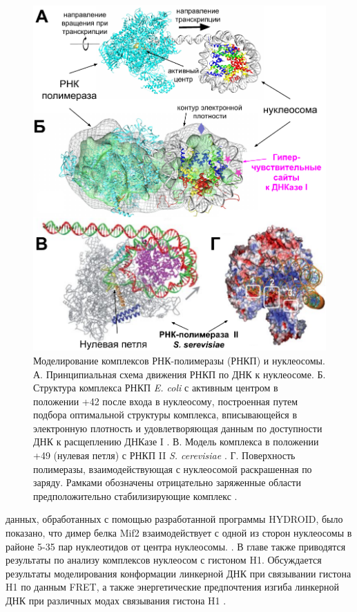 \begin{figure} [H]
    \centering
    \includegraphics[width=\textwidth]{images/p6/p6_2/p6_2_polII_synopsis.pdf}
    \caption{Моделирование комплексов РНК-полимеразы (РНКП) и нуклеосомы. А. Принципиальная схема движения РНКП по ДНК к нуклеосоме. Б. Структура комплекса РНКП \textit{E. coli} с активным центром в положении +42 после входа в нуклеосому, построенная путем подбора оптимальной структуры комплекса, вписывающейся в электронную плотность и удовлетворяющая данным по доступности ДНК к расщеплению ДНКазе I \cite{gaykalova_structural_2015}. В. Модель комплекса в положении +49 (нулевая петля) с РНКП II \textit{S. cerevisiae} \cite{chang_analysis_2014}. Г. Поверхность полимеразы, взаимодействующая с нуклеосомой раскрашенная по заряду. Рамками обозначены отрицательно заряженные области предположительно стабилизирующие комплекс \cite{chang_analysis_2014}. }
    \label{fig:p6_2_polII_synopsis}
\end{figure}

\noindent
данных, обработанных с помощью разработанной программы HYDROID, было показано, что димер белка Mif2 взаимодействует с одной из сторон нуклеосомы в районе 5-35 пар нуклеотидов от центра нуклеосомы.   \cite{xiao_molecular_2017}. В главе также приводятся результаты по анализу комплексов нуклеосом с гистоном H1. 
Обсуждается результаты моделирования конформации линкерной ДНК при связывании гистона H1 по данным FRET, а также энергетические предпочтения изгиба линкерной ДНК при различных модах связывания гистона H1 \cite{gorkovets_joint_2018,bass_effect_2019,armeev_modeling_2016}. 

